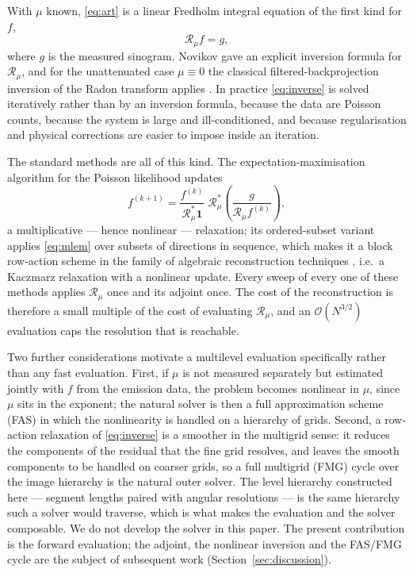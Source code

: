 \documentclass[11pt]{article}
\newcommand{\Rmu}{\mathcal{R}_{\mu}}
\newcommand{\bigO}{\mathcal{O}}
\begin{document}
With $\mu$ known, \eqref{eq:art} is a linear Fredholm integral equation of the
first kind for $f$,
\begin{equation}
  \Rmu f = g ,
  \label{eq:inverse}
\end{equation}
where $g$ is the measured sinogram. Novikov \citep{novikov2002} gave an
explicit inversion formula for $\Rmu$, and for the unattenuated case
$\mu\equiv 0$ the classical filtered-backprojection inversion of the Radon
transform applies \citep{natterer2001}. In practice \eqref{eq:inverse} is
solved iteratively rather than by an inversion formula, because the data are
Poisson counts, because the system is large and ill-conditioned, and because
regularisation and physical corrections are easier to impose inside an
iteration.

The standard methods are all of this kind. The expectation-maximisation
algorithm for the Poisson likelihood \citep{sheppvardi1982} updates
\begin{equation}
  f^{(k+1)} = \frac{f^{(k)}}{\Rmu^{*}\mathbf{1}}\;
              \Rmu^{*}\!\left(\frac{g}{\Rmu f^{(k)}}\right),
  \label{eq:mlem}
\end{equation}
a multiplicative --- hence nonlinear --- relaxation; its ordered-subset
variant \citep{hudsonlarkin1994} applies \eqref{eq:mlem} over subsets of
directions in sequence, which makes it a block row-action scheme in the family
of algebraic reconstruction techniques \citep{gordon1970}, i.e.\ a Kaczmarz
relaxation with a nonlinear update. Every sweep of every one of these methods
applies $\Rmu$ once and its adjoint once. The cost of the reconstruction is
therefore a small multiple of the cost of evaluating $\Rmu$, and an
$\bigO(N^{3/2})$ evaluation caps the resolution that is reachable.

Two further considerations motivate a multilevel evaluation specifically
rather than any fast evaluation. First, if $\mu$ is not measured separately
but estimated jointly with $f$ from the emission data, the problem becomes
nonlinear in $\mu$, since $\mu$ sits in the exponent; the natural solver is
then a full approximation scheme (FAS) \citep{brandt1977} in which the
nonlinearity is handled on a hierarchy of grids. Second, a row-action
relaxation of \eqref{eq:inverse} is a smoother in the multigrid sense: it
reduces the components of the residual that the fine grid resolves, and leaves
the smooth components to be handled on coarser grids, so a full multigrid
(FMG) cycle over the image hierarchy is the natural outer solver. The level
hierarchy constructed here --- segment lengths paired with angular resolutions
--- is the same hierarchy such a solver would traverse, which is what makes the
evaluation and the solver composable. We do not develop the solver in this
paper. The present contribution is the forward evaluation; the adjoint, the
nonlinear inversion and the FAS/FMG cycle are the subject of subsequent work
(Section~\ref{sec:discussion}).
\end{document}

